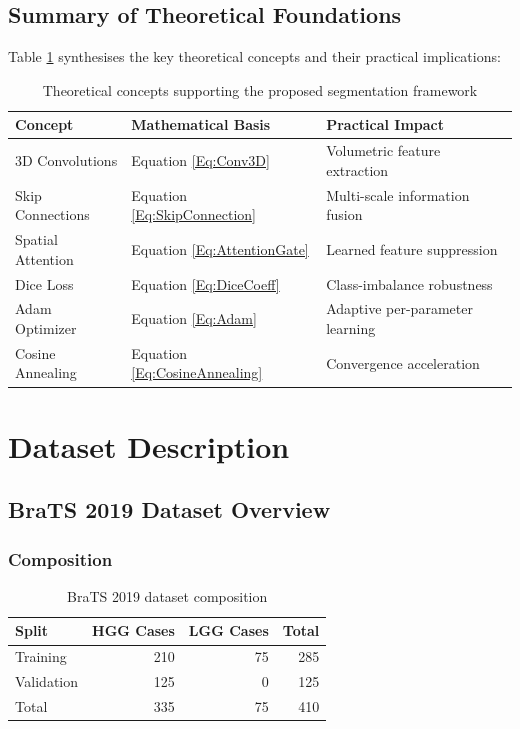 \documentclass{ecsproject}     %
\begin{document}
\section{Summary of Theoretical Foundations}

Table \ref{Table:Theoretical} synthesises the key theoretical concepts and their practical implications:

\begin{table}[h]
\centering
\small
\begin{tabular}{|p{3cm}|p{3cm}|p{3cm}|}
\hline
\textbf{Concept} & \textbf{Mathematical Basis} & \textbf{Practical Impact} \\
\hline
3D Convolutions & Equation \ref{Eq:Conv3D} & Volumetric feature extraction \\
\hline
Skip Connections & Equation \ref{Eq:SkipConnection} & Multi-scale information fusion \\
\hline
Spatial Attention & Equation \ref{Eq:AttentionGate} & Learned feature suppression \\
\hline
Dice Loss & Equation \ref{Eq:DiceCoeff} & Class-imbalance robustness \\
\hline
Adam Optimizer & Equation \ref{Eq:Adam} & Adaptive per-parameter learning \\
\hline
Cosine Annealing & Equation \ref{Eq:CosineAnnealing} & Convergence acceleration \\
\hline
\end{tabular}
\caption{Theoretical concepts supporting the proposed segmentation framework}
\label{Table:Theoretical}
\end{table}


\chapter{Dataset Description} \label{Chapter:Dataset}

\section{BraTS 2019 Dataset Overview}

\subsection{Composition}

\begin{table}[h]
\centering
\begin{tabular}{|l|r|r|r|}
\hline
\textbf{Split} & \textbf{HGG Cases} & \textbf{LGG Cases} & \textbf{Total} \\
\hline
Training & 210 & 75 & 285 \\
Validation & 125 & 0 & 125 \\
\hline
Total & 335 & 75 & 410 \\
\hline
\end{tabular}
\caption{BraTS 2019 dataset composition}
\label{Table:BRATS_Composition}
\end{table}
\end{document}
